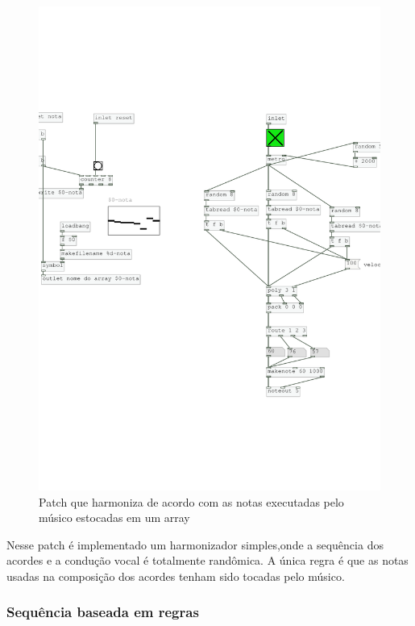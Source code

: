 \documentclass{ppgmus}
\begin{document}
\begin{figure}
\includegraphics[scale=.5]{harm6}
\caption{Patch que harmoniza de acordo com as notas executadas pelo músico estocadas em um array}
\label{harm6}
\end{figure}

Nesse patch é implementado um harmonizador simples,onde a sequência dos acordes e
a condução vocal é totalmente randômica. A única regra é que as notas usadas na composição
dos acordes tenham sido tocadas pelo músico.

\subsubsection{Sequência baseada em regras}

\end{document}
